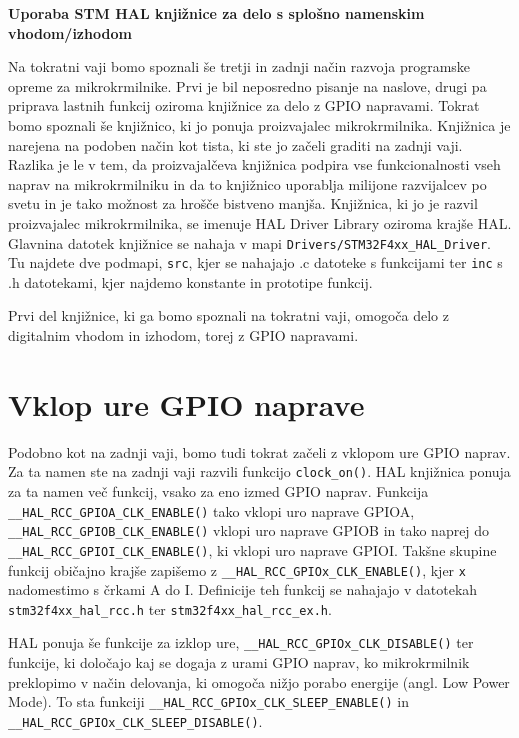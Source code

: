 \documentclass[12pt,letterpaper]{article}
\begin{document}
\begin{center}
    \textbf{\Large Uporaba STM HAL knjižnice za delo s splošno namenskim vhodom/izhodom}   
\end{center}

Na tokratni vaji bomo spoznali še tretji in zadnji način razvoja programske opreme za mikrokrmilnike. Prvi je bil neposredno pisanje na naslove, drugi pa priprava lastnih funkcij oziroma knjižnice za delo z GPIO napravami. Tokrat bomo spoznali še knjižnico, ki jo ponuja proizvajalec mikrokrmilnika. Knjižnica je narejena na podoben način kot tista, ki ste jo začeli graditi na zadnji vaji. Razlika je le v tem, da proizvajalčeva knjižnica podpira vse funkcionalnosti vseh naprav na mikrokrmilniku in da to knjižnico uporablja milijone razvijalcev po svetu in je tako možnost za hrošče bistveno manjša. Knjižnica, ki jo je razvil proizvajalec mikrokrmilnika, se imenuje HAL Driver Library oziroma krajše HAL. Glavnina datotek knjižnice se nahaja v mapi \texttt{Drivers/STM32F4xx\_HAL\_Driver}. Tu najdete dve podmapi, \texttt{src}, kjer se nahajajo .c datoteke s funkcijami ter \texttt{inc} s .h datotekami, kjer najdemo konstante in prototipe funkcij.

Prvi del knjižnice, ki ga bomo spoznali na tokratni vaji, omogoča delo z digitalnim vhodom in izhodom, torej z GPIO napravami.


\section*{Vklop ure GPIO naprave}

Podobno kot na zadnji vaji, bomo tudi tokrat začeli z vklopom ure GPIO naprav. Za ta namen ste na zadnji vaji razvili funkcijo \texttt{clock\_on()}. HAL knjižnica ponuja za ta namen več funkcij, vsako za eno izmed GPIO naprav. Funkcija \texttt{\_\_HAL\_RCC\_GPIOA\_CLK\_ENABLE()} tako vklopi uro naprave GPIOA, \texttt{\_\_HAL\_RCC\_GPIOB\_CLK\_ENABLE()} vklopi uro naprave GPIOB in tako naprej do \texttt{\_\_HAL\_RCC\_GPIOI\_CLK\_ENABLE()}, ki vklopi uro naprave GPIOI. Takšne skupine funkcij običajno krajše zapišemo z \texttt{\_\_HAL\_RCC\_GPIOx\_CLK\_ENABLE()}, kjer \texttt{x} nadomestimo s črkami A do I. Definicije teh funkcij se nahajajo v datotekah \texttt{stm32f4xx\_hal\_rcc.h} ter \texttt{stm32f4xx\_hal\_rcc\_ex.h}.

HAL ponuja še funkcije za izklop ure, \texttt{\_\_HAL\_RCC\_GPIOx\_CLK\_DISABLE()} ter funkcije, ki določajo kaj se dogaja z urami GPIO naprav, ko mikrokrmilnik preklopimo v način delovanja, ki omogoča nižjo porabo energije (angl. Low Power Mode). To sta funkciji \texttt{\_\_HAL\_RCC\_GPIOx\_CLK\_SLEEP\_ENABLE()} in \texttt{\_\_HAL\_RCC\_GPIOx\_CLK\_SLEEP\_DISABLE()}.
\end{document}
